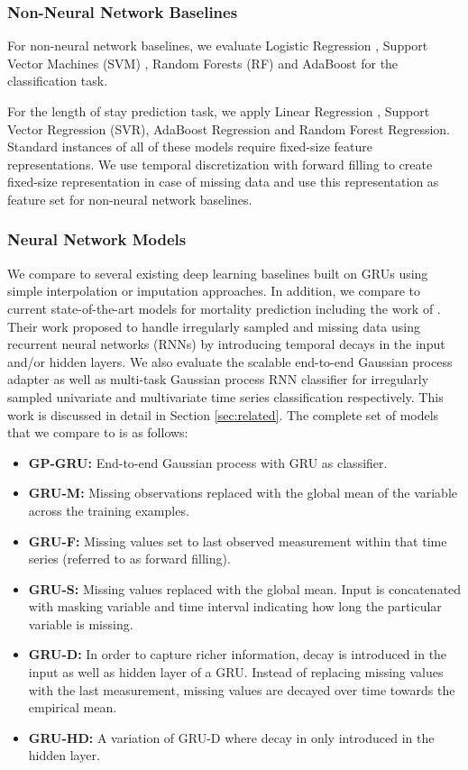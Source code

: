 \documentclass{article} \usepackage{iclr2019_conference,times}
\begin{document}
\subsubsection{Non-Neural Network Baselines}
For non-neural network baselines, we evaluate Logistic Regression \citep{hosmer2013applied}, Support Vector Machines (SVM) \citep{cortes1995}, Random Forests (RF) \citep{breiman_rf} and AdaBoost \citep{adaboost} for the classification task.

For the length of stay prediction task, we apply Linear Regression \citep{hastie01statisticallearning}, Support Vector Regression (SVR), AdaBoost Regression \citep{drucker} and Random Forest Regression. Standard instances of all of these models require fixed-size feature representations. We use temporal discretization with forward filling to create fixed-size representation in case of missing data and use this representation as feature set for non-neural network baselines. 


\subsubsection{Neural Network Models}
We compare to several existing deep learning baselines built on GRUs using simple interpolation or imputation approaches. In addition, we compare to current state-of-the-art models for mortality prediction including the work of \cite{che2016recurrent}. Their work proposed to handle irregularly sampled and missing data using recurrent neural networks (RNNs) by introducing temporal decays in the input and/or hidden layers.  We also evaluate the scalable end-to-end Gaussian process adapter  \citep{li2016scalable} as well as multi-task Gaussian process RNN classifier \citep{futoma2017improved} for
irregularly sampled univariate and multivariate time series classification respectively.  This work is discussed in detail in Section 
\ref{sec:related}. The complete set of models that we compare to is as follows:

\begin{itemize}
\item{\bf GP-GRU:} End-to-end Gaussian process with GRU as classifier.
\item {\bf GRU-M:} Missing observations replaced with the global mean of the variable across the training examples. 
\item {\bf GRU-F:} Missing values set to last observed measurement within that time series (referred to as forward filling). 
\item {\bf GRU-S:}  Missing values replaced with the global mean. Input is concatenated with masking variable
and time interval indicating how long the particular variable is missing. 
\item {\bf GRU-D:}  In order to capture richer information, decay is introduced in the input as well as hidden layer of a GRU. Instead of replacing missing values with the last measurement, missing values are decayed over time towards the empirical mean. 
\item{\bf GRU-HD:} A variation of GRU-D where decay in only introduced in the hidden layer.

\end{itemize}
\end{document}
